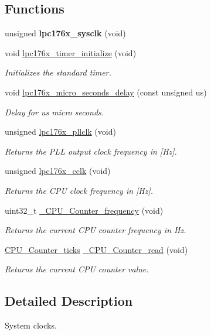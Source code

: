 \subsection*{Functions}
\begin{DoxyCompactItemize}
\item 
\mbox{\label{lpc176x_2start_2system-clocks_8c_a33a9032091a9f63f776f06031d1e7787}} 
unsigned {\bfseries lpc176x\+\_\+sysclk} (void)
\item 
void \mbox{\hyperlink{group__lpc176x__clock_ga36b647bb6e1c61bb2b688eab520effc7}{lpc176x\+\_\+timer\+\_\+initialize}} (void)
\begin{DoxyCompactList}\small\item\em Initializes the standard timer. \end{DoxyCompactList}\item 
void \mbox{\hyperlink{group__lpc176x__clock_gac77b85bc6bddf82f57b59d4c340fbd24}{lpc176x\+\_\+micro\+\_\+seconds\+\_\+delay}} (const unsigned us)
\begin{DoxyCompactList}\small\item\em Delay for {\itshape us} micro seconds. \end{DoxyCompactList}\item 
unsigned \mbox{\hyperlink{group__lpc176x__clock_ga1838b91b836f6ac5a926f2976cc3ff91}{lpc176x\+\_\+pllclk}} (void)
\begin{DoxyCompactList}\small\item\em Returns the P\+LL output clock frequency in \mbox{[}Hz\mbox{]}. \end{DoxyCompactList}\item 
unsigned \mbox{\hyperlink{group__lpc176x__clock_gabd5c49363477314782dd3ce3521962b1}{lpc176x\+\_\+cclk}} (void)
\begin{DoxyCompactList}\small\item\em Returns the C\+PU clock frequency in \mbox{[}Hz\mbox{]}. \end{DoxyCompactList}\item 
uint32\+\_\+t \mbox{\hyperlink{group__RTEMSScoreCPUARM_gaa675150e5d00169c99410a82011b6117}{\+\_\+\+C\+P\+U\+\_\+\+Counter\+\_\+frequency}} (void)
\begin{DoxyCompactList}\small\item\em Returns the current C\+PU counter frequency in Hz. \end{DoxyCompactList}\item 
\mbox{\hyperlink{no__cpu_2include_2rtems_2score_2cpu_8h_a67f8550aad58bccb6fcb4589894444ad}{C\+P\+U\+\_\+\+Counter\+\_\+ticks}} \mbox{\hyperlink{group__RTEMSScoreCPUARM_gac016ae4ed92ed2607bd65408a36d908b}{\+\_\+\+C\+P\+U\+\_\+\+Counter\+\_\+read}} (void)
\begin{DoxyCompactList}\small\item\em Returns the current C\+PU counter value. \end{DoxyCompactList}\end{DoxyCompactItemize}


\subsection{Detailed Description}
System clocks. 

